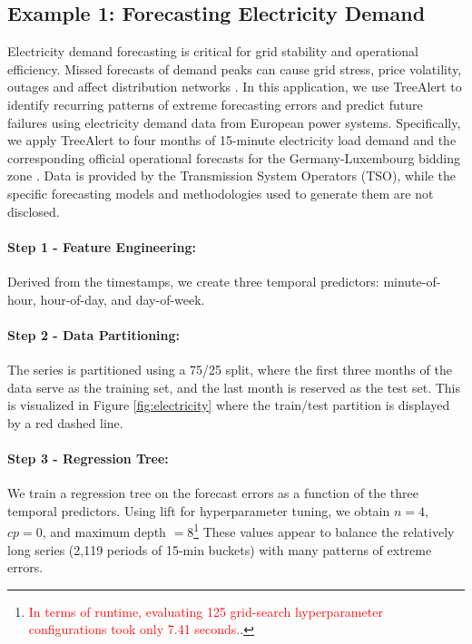 \documentclass[]{interact}
\newcommand{\matt}[1]{\textcolor{red}{#1}}
\theoremstyle{definition}
\begin{document}
\subsection{Example 1: Forecasting Electricity Demand}
Electricity demand forecasting is critical for grid stability and operational efficiency. Missed forecasts of demand peaks can cause grid stress, price volatility, outages and affect distribution networks \citep{ciarreta2023, gilbert2023, steinbuks2019}. In this application, we use TreeAlert to identify recurring patterns of extreme forecasting errors and predict future failures using electricity demand data from European power systems. Specifically, we apply TreeAlert to four months of 15-minute electricity load demand and the corresponding official operational forecasts for the Germany-Luxembourg bidding zone %
\citep{entsoe2025}. Data is provided by the Transmission System Operators (TSO), while the specific forecasting models and methodologies used to generate them are not disclosed. %

\paragraph*{Step 1 - Feature Engineering:}
Derived from the timestamps, we create three temporal predictors: minute-of-hour, hour-of-day, and day-of-week.

\paragraph*{Step 2 - Data Partitioning:} The series is partitioned using a 75/25 split, where the first three months of the data serve as the training set, and the last month is reserved as the test set. This is visualized in Figure \ref{fig:electricity} where the train/test partition is displayed by a red dashed line.

\paragraph*{Step 3 - Regression Tree:} We train a regression tree on the forecast errors as a function of the three temporal predictors. Using lift for hyperparameter tuning, we obtain $n = 4$, $cp = 0$, and maximum depth $=8$\footnote{\matt{In terms of runtime, evaluating 125 grid-search hyperparameter configurations took only 7.41 seconds.}.} These values appear to balance the relatively long series %
(2,119 periods of 15-min buckets) with many patterns of extreme errors. %
\end{document}

